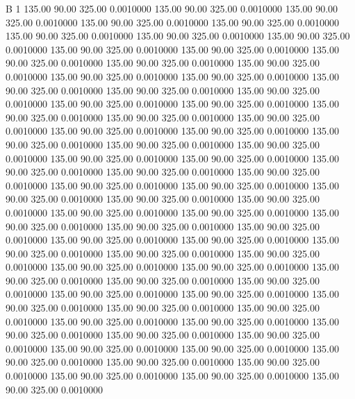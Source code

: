 


B 1
 135.00   90.00  325.00   0.0010000
 135.00   90.00  325.00   0.0010000
 135.00   90.00  325.00   0.0010000
 135.00   90.00  325.00   0.0010000
 135.00   90.00  325.00   0.0010000
 135.00   90.00  325.00   0.0010000
 135.00   90.00  325.00   0.0010000
 135.00   90.00  325.00   0.0010000
 135.00   90.00  325.00   0.0010000
 135.00   90.00  325.00   0.0010000
 135.00   90.00  325.00   0.0010000
 135.00   90.00  325.00   0.0010000
 135.00   90.00  325.00   0.0010000
 135.00   90.00  325.00   0.0010000
 135.00   90.00  325.00   0.0010000
 135.00   90.00  325.00   0.0010000
 135.00   90.00  325.00   0.0010000
 135.00   90.00  325.00   0.0010000
 135.00   90.00  325.00   0.0010000
 135.00   90.00  325.00   0.0010000
 135.00   90.00  325.00   0.0010000
 135.00   90.00  325.00   0.0010000
 135.00   90.00  325.00   0.0010000
 135.00   90.00  325.00   0.0010000
 135.00   90.00  325.00   0.0010000
 135.00   90.00  325.00   0.0010000
 135.00   90.00  325.00   0.0010000
 135.00   90.00  325.00   0.0010000
 135.00   90.00  325.00   0.0010000
 135.00   90.00  325.00   0.0010000
 135.00   90.00  325.00   0.0010000
 135.00   90.00  325.00   0.0010000
 135.00   90.00  325.00   0.0010000
 135.00   90.00  325.00   0.0010000
 135.00   90.00  325.00   0.0010000
 135.00   90.00  325.00   0.0010000
 135.00   90.00  325.00   0.0010000
 135.00   90.00  325.00   0.0010000
 135.00   90.00  325.00   0.0010000
 135.00   90.00  325.00   0.0010000
 135.00   90.00  325.00   0.0010000
 135.00   90.00  325.00   0.0010000
 135.00   90.00  325.00   0.0010000
 135.00   90.00  325.00   0.0010000
 135.00   90.00  325.00   0.0010000
 135.00   90.00  325.00   0.0010000
 135.00   90.00  325.00   0.0010000
 135.00   90.00  325.00   0.0010000
 135.00   90.00  325.00   0.0010000
 135.00   90.00  325.00   0.0010000
 135.00   90.00  325.00   0.0010000
 135.00   90.00  325.00   0.0010000
 135.00   90.00  325.00   0.0010000
 135.00   90.00  325.00   0.0010000
 135.00   90.00  325.00   0.0010000
 135.00   90.00  325.00   0.0010000
 135.00   90.00  325.00   0.0010000
 135.00   90.00  325.00   0.0010000
 135.00   90.00  325.00   0.0010000
 135.00   90.00  325.00   0.0010000
 135.00   90.00  325.00   0.0010000
 135.00   90.00  325.00   0.0010000
 135.00   90.00  325.00   0.0010000
 135.00   90.00  325.00   0.0010000
 135.00   90.00  325.00   0.0010000
 135.00   90.00  325.00   0.0010000
 135.00   90.00  325.00   0.0010000
 135.00   90.00  325.00   0.0010000
 135.00   90.00  325.00   0.0010000
 135.00   90.00  325.00   0.0010000
 135.00   90.00  325.00   0.0010000
